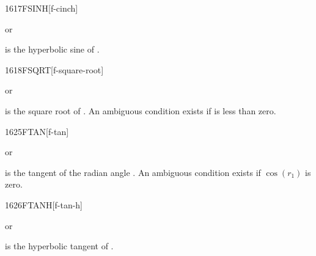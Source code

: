 \vspace*{-4ex}
\begin{worddef}{1617}{FSINH}[f-cinch]
\item {} or

	 is the hyperbolic sine of .
\end{worddef}

\enlargethispage{8ex}\vspace*{-2.5ex}
\begin{worddef}{1618}{FSQRT}[f-square-root]
\item {} or

	 is the square root of . An ambiguous
	condition exists if  is less than zero.
\end{worddef}

\vspace*{-2.5ex}
\begin{worddef}{1625}{FTAN}[f-tan]
\item {} or

	 is the tangent of the radian angle . An
	ambiguous condition exists if $\cos(r_1)$ is zero.
\end{worddef}

\vspace*{-2.5ex}
\begin{worddef}{1626}{FTANH}[f-tan-h]
\item {} or

	 is the hyperbolic tangent of .
\end{worddef}

